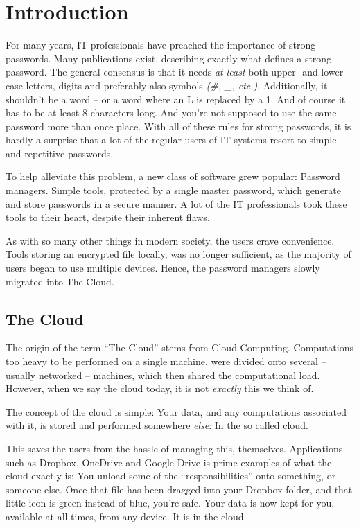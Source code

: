 \chapter{Introduction}
	\label{chap:intro}
	For many years, IT professionals have preached the importance of strong passwords. Many publications exist, describing exactly what defines a strong password. The general consensus is that it needs \emph{at least} both upper- and lower-case letters, digits and preferably also symbols \emph{(\#, \_, etc.)}. Additionally, it shouldn't be a word -- or a word where an L is replaced by a 1. And of course it has to be at least 8 characters long. And you're not supposed to use the same password more than once place. With all of these rules for strong passwords, it is hardly a surprise that a lot of the regular users of IT systems resort to simple and repetitive passwords.

	To help alleviate this problem, a new class of software grew popular: Password managers. Simple tools, protected by a single master password, which generate and store passwords in a secure manner. A lot of the IT professionals took these tools to their heart, despite their inherent flaws. 

	As with so many other things in modern society, the users crave convenience. Tools storing an encrypted file locally, was no longer sufficient, as the majority of users began to use multiple devices. Hence, the password managers slowly migrated into The Cloud.

	\section{The Cloud}
		The origin of the term ``The Cloud'' stems from Cloud Computing. Computations too heavy to be performed on a single machine, were divided onto several -- usually networked -- machines, which then shared the computational load. However, when we say the cloud today, it is not \emph{exactly} this we think of.

		The concept of the cloud is simple: Your data, and any computations associated with it, is stored and performed somewhere \emph{else}: In the so called cloud.

		This saves the users from the hassle of managing this, themselves. Applications such as Dropbox, OneDrive and Google Drive is prime examples of what the cloud exactly is: You unload some of the ``responsibilities'' onto something, or someone else. Once that file has been dragged into your Dropbox folder, and that little icon is green instead of blue, you're safe. Your data is now kept for you, available at all times, from any device. It is in the cloud.

